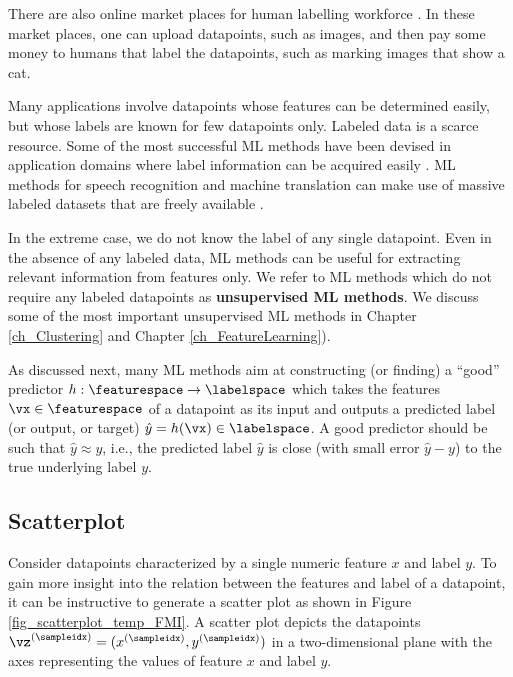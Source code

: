 \documentclass[12pt]{report}
\begin{document}
There are also online market places for human labelling 
workforce \cite{Mort2018}. In these market places, one 
can upload datapoints, such as images, and then pay 
some money to humans that label the datapoints, such 
as marking images that show a cat. 

Many applications involve datapoints whose features can be 
determined easily, but whose labels are known for few datapoints 
only. Labeled data is a scarce resource. Some of the most successful 
ML methods have been devised in application domains where 
label information can be acquired easily \cite{UnreasonableData}. 
ML methods for  speech recognition and machine translation can 
make use of massive labeled datasets that are freely available \cite{Koehn2005}. 

In the extreme case, we do not know the label of any single 
datapoint. Even in the absence of any labeled data, ML methods 
can be useful for extracting relevant information from 
features only. We refer to ML methods which do not require 
any labeled datapoints as {\bf unsupervised ML methods}. 
We discuss some of the most important unsupervised ML 
methods in Chapter \ref{ch_Clustering} and Chapter \ref{ch_FeatureLearning}).  

As discussed next, many ML methods aim at constructing 
(or finding) a ``good'' predictor $h: \featurespace \rightarrow \labelspace$ 
which takes the features $\vx \in \featurespace$ of a datapoint 
as its input and outputs a predicted label (or output, or target) 
$\hat{y} = h(\vx) \in \labelspace$. A good predictor should be 
such that $\hat{y} \approx y$, i.e., the predicted label $\hat{y}$ 
is close (with small error $\hat{y} - y$) to the true underlying label $y$. 

\subsection{Scatterplot} 
\label{equ_subsection_scatterplot}

Consider datapoints characterized by a single numeric feature $x$ 
and label $y$. 
To gain more insight into the relation between the features 
and label of a datapoint, it can be instructive to generate a 
scatter plot as shown in Figure \ref{fig_scatterplot_temp_FMI}. 
A scatter plot depicts the datapoints $\vz^{(\sampleidx)}=(x^{(\sampleidx)},y^{(\sampleidx)})$ 
in a two-dimensional plane with the axes representing the values 
of feature $x$ and label $y$. 
\end{document}
